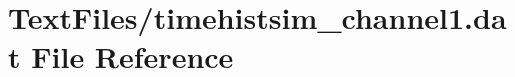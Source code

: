 \hypertarget{TextFiles_2timehistsim__channel1_8dat}{}\section{Text\+Files/timehistsim\+\_\+channel1.dat File Reference}
\label{TextFiles_2timehistsim__channel1_8dat}
